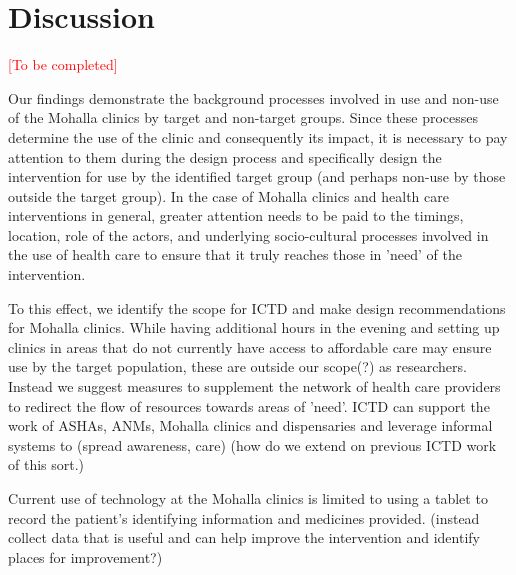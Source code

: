 \section{Discussion}

\textcolor{red}{[To be completed]}

Our findings demonstrate the background processes involved in use and non-use of the Mohalla clinics by target and non-target groups. Since these processes determine the use of the clinic and consequently its impact, it is necessary to pay attention to them during the design process and specifically design the intervention for use by the identified target group (and perhaps non-use by those outside the target group). In the case of Mohalla clinics and health care interventions in general, greater attention needs to be paid to the timings, location, role of the actors, and underlying socio-cultural processes involved in the use of health care to ensure that it truly reaches those in 'need' of the intervention.

To this effect, we identify the scope for ICTD and make design recommendations for Mohalla clinics. While having additional hours in the evening and setting up clinics in areas that do not currently have access to affordable care may ensure use by the target population, these are outside our scope(?) as researchers. Instead we suggest measures to supplement the network of health care providers to redirect the flow of resources towards areas of 'need'. ICTD can support the work of ASHAs, ANMs, Mohalla clinics and dispensaries and leverage informal systems to (spread awareness, care) (how do we extend on previous ICTD work of this sort.)

Current use of technology at the Mohalla clinics is limited to using a tablet to record the patient's identifying information and medicines provided. (instead collect data that is useful and can help improve the intervention and identify places for improvement?)





